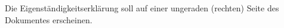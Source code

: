 
Die Eigenständigkeitserklärung soll auf einer ungeraden (rechten) Seite des Dokumentes erscheinen.
